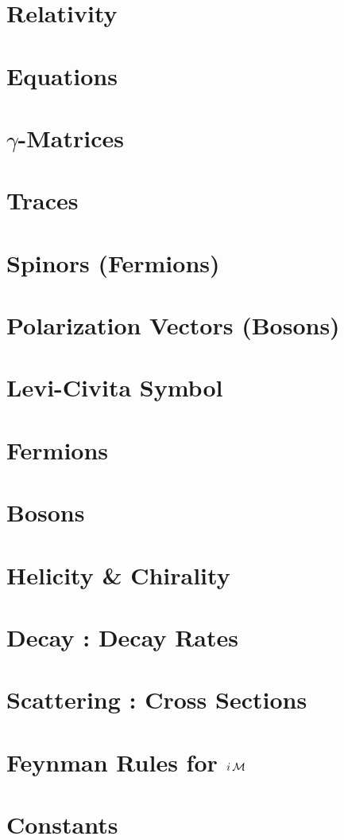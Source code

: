 \documentclass[landscape,8pt,a4paper,english]{extarticle}
\begin{document}
\begin{multicols*}{3}\centering
        \section*{Relativity}
        \section*{Equations}
        \section*{$\gamma$-Matrices}
        \section*{Traces}
        \section*{Spinors (Fermions)}
        \section*{Polarization Vectors (Bosons)}
        \section*{Levi-Civita Symbol}
        \section*{Fermions}
        \section*{Bosons}
        \section*{Helicity \& Chirality}
        \section*{Decay : Decay Rates}
        \section*{Scattering : Cross Sections}
        \section*{Feynman Rules for $i\operatorname{\mathcal{M}}$}
        \section*{Constants}
\end{multicols*}
\end{document}
